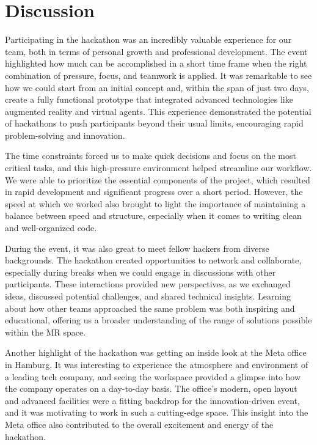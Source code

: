\documentclass[12pt]{article}
\begin{document}
\section{Discussion}
\label{sec:discussion}

Participating in the hackathon was an incredibly valuable experience for our team, both in terms of personal growth and professional development. The event highlighted how much can be accomplished in a short time frame when the right combination of pressure, focus, and teamwork is applied. It was remarkable to see how we could start from an initial concept and, within the span of just two days, create a fully functional prototype that integrated advanced technologies like augmented reality and virtual agents. This experience demonstrated the potential of hackathons to push participants beyond their usual limits, encouraging rapid problem-solving and innovation.

The time constraints forced us to make quick decisions and focus on the most critical tasks, and this high-pressure environment helped streamline our workflow. We were able to prioritize the essential components of the project, which resulted in rapid development and significant progress over a short period. However, the speed at which we worked also brought to light the importance of maintaining a balance between speed and structure, especially when it comes to writing clean and well-organized code.

During the event, it was also great to meet fellow hackers from diverse backgrounds. The hackathon created opportunities to network and collaborate, especially during breaks when we could engage in discussions with other participants. These interactions provided new perspectives, as we exchanged ideas, discussed potential challenges, and shared technical insights. Learning about how other teams approached the same problem was both inspiring and educational, offering us a broader understanding of the range of solutions possible within the MR space.

Another highlight of the hackathon was getting an inside look at the Meta office in Hamburg. It was interesting to experience the atmosphere and environment of a leading tech company, and seeing the workspace provided a glimpse into how the company operates on a day-to-day basis. The office’s modern, open layout and advanced facilities were a fitting backdrop for the innovation-driven event, and it was motivating to work in such a cutting-edge space. This insight into the Meta office also contributed to the overall excitement and energy of the hackathon.
\end{document}
